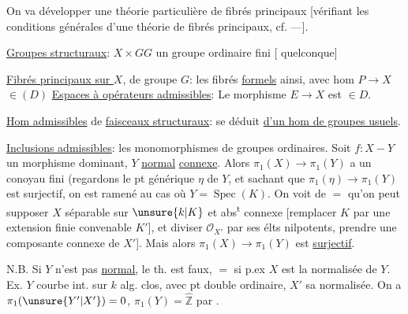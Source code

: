 On va développer une théorie particulière de fibrés principaux [vérifiant les conditions générales  d'une théorie de fibrés principaux, cf. ---].

\uline{Groupes structuraux}: $X\times G$\qquad $G$ un groupe ordinaire fini [ quelconque]

\uline{Fibrés principaux  sur $X$}, de groupe $G$: les fibrés \uline{formels} ainsi, avec hom $P\to X$ $\in(D)$
\uline{Espaces à opérateurs admissibles}: Le morphisme $E\to X$ est $\in D$.

\uline{Hom admissibles} de  \uline{faisceaux structuraux}: se déduit \uline{d'un hom de groupes usuels}.

 \uline{Inclusions admissibles}: les monomorphismes de groupes ordinaires.
Soit $f:X-Y$ un morphisme  dominant, $Y$  \uline{normal} \uline{connexe}.
Alors $\pi_1(X)\to\pi_1(Y)$ a un conoyau fini
(regardons le pt générique $\eta$ de $Y$, et sachant que $\pi_1(\eta)\to\pi_1(Y)$ est surjectif, on est ramené au cas où $Y=\operatorname{Spec}(K)$.
On voit de $=$ qu'on peut supposer $X$ séparable sur $\unsure{k|K}$ et abs\textsuperscript{t} connexe
[remplacer $K$ par une extension  finie convenable $K'$], et diviser $\mathcal O_{X'}$ par ses élts nilpotents,  prendre une composante connexe de $X'$].
Mais alors $\pi_1(X)\longrightarrow\pi_1(Y)$ est \uline{surjectif}.


N.B. Si $Y$ n'est pas \uline{normal}, le th. est faux, $=$ si p.ex $X$ est la normalisée de $Y$.
Ex. $Y$ courbe int. sur $k$ alg. clos, avec pt double ordinaire, $X'$ sa normalisée.
On a $\pi_1(\unsure{Y'|X'})=0$, $\pi_1(Y)=\widehat{\mathbb Z}$
   par .


